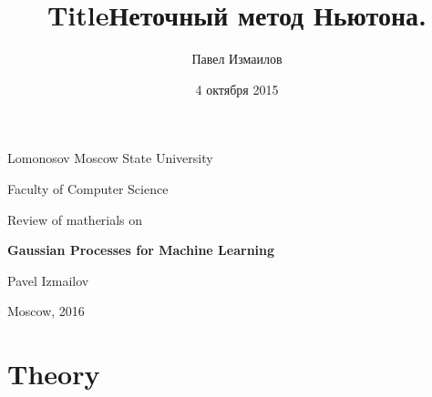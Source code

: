 \documentclass[12pt]{article}
\title{Title}
\title{Неточный метод Ньютона.}
\date{4 октября 2015}
\author{Павел Измаилов}
\begin{document}
\renewcommand{\contentsname}{\centerline{\bf Contents}}
\renewcommand{\refname}{\centerline{\bf Literature}}

\newcommand{\GP}{\mathcal{GP}}
\newcommand{\E}{\mathbb{E}}
\newcommand{\R}{\mathbb{R}}
\newcommand{\N}{\mathcal{N}}
\newcommand{\cov}{\mbox{cov}}
\newcommand{\Nystrom}{Nystr\"{o}m }
\newcommand{\KL}[2]{\mbox{KL}\left(#1\mbox{ || }#2\right)}
\newcommand{\tr}{\mbox{tr}}
\newcommand{\derivative}[2]{\frac{\partial #1}{\partial #2}}
\newcommand{\sndderivative}[3]{\frac{\partial^2 #1}{\partial #2 \partial #3}}

\newlength{\arrayrulewidthOriginal}
\newcommand{\Cline}[2]{%
  \noalign{\global\setlength{\arrayrulewidthOriginal}{\arrayrulewidth}}%
  \noalign{\global\setlength{\arrayrulewidth}{#1}}\cline{#2}%
  \noalign{\global\setlength{\arrayrulewidth}{\arrayrulewidthOriginal}}}

\newtheorem{definition}{Definition}
\newtheorem{theorem}{Theorem}


\def\vec#1{\mathchoice{\mbox{\boldmath$\displaystyle#1$}}
{\mbox{\boldmath$\textstyle#1$}} {\mbox{\boldmath$\scriptstyle#1$}} {\mbox{\boldmath$\scriptscriptstyle#1$}}}

\centerline{Lomonosov Moscow State University}

\centerline{Faculty of Computer Science}

\vspace{5 cm}

\centerline{\Large Review of matherials on}

\vspace{1 cm}

\centerline{\Large \bf Gaussian Processes for Machine Learning}

\vspace{6 cm}

\begin{flushright}

Pavel Izmailov
\end{flushright}

\vfill 

\centerline{Moscow,  2016}
\thispagestyle{empty} 
\pagebreak

\section{Theory}
\end{document}
